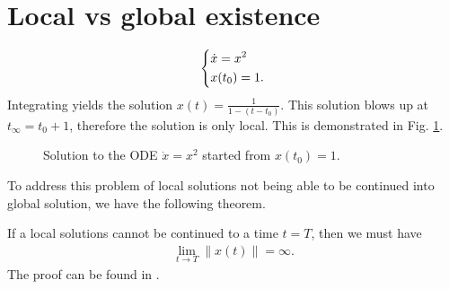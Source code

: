 \section{Local vs global existence}
\begin{ex}
	\begin{align}
		\begin{dcases}
			\dot{x} = x^2 \\
			x(t_0) = 1.
		\end{dcases}
	\end{align}
	Integrating yields the solution $x(t) = \frac{1}{1 - (t-t_0)}$. This solution blows up at $t_{\infty }=t_0 + 1$, therefore the solution is only local. This is demonstrated in Fig. \ref{fig:exploding_solution}.	
\begin{figure}[h!]
\centering	
{}
\caption{Solution to the ODE $\dot{x}=x^2$ started from $x(t_0)=1$.}
	\label{fig:exploding_solution}
\end{figure}
\end{ex}
To address this problem of local solutions not being able to be continued into global solution, we have the following theorem.
\begin{theorem}
	If a local solutions cannot be continued to a time $t=T$, then we must have
	\begin{align}
		\boxed{\lim_{t\to T}  \| {x}(t) \|= \infty.}
	\end{align}
	The proof can be found in \cite{Arnold}.	
\end{theorem}

